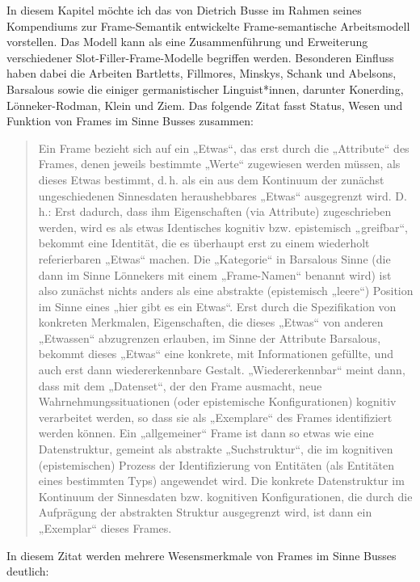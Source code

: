 In diesem Kapitel möchte ich das von Dietrich Busse im Rahmen seines Kompendiums zur Frame-Semantik \autocite*{busseFrameSemantikKompendium2012} entwickelte Frame-semantische Arbeitsmodell vorstellen. Das Modell kann als eine Zusammenführung und Erweiterung verschiedener Slot-Filler-Frame-Modelle begriffen werden. Besonderen Einfluss haben dabei die Arbeiten Bartletts, Fillmores, Minskys, Schank und Abelsons, Barsalous sowie die einiger germanistischer Linguist*innen, darunter Konerding, Lönneker-Rodman, Klein und Ziem. Das folgende Zitat fasst Status, Wesen und Funktion von Frames im Sinne Busses zusammen:

\begin{quote}
Ein Frame bezieht sich auf ein „Etwas``, das erst durch die „Attribute`` des Frames, denen jeweils bestimmte „Werte`` zugewiesen werden müssen, als dieses Etwas bestimmt, d.\,h. als ein aus dem Kontinuum der zunächst ungeschiedenen Sinnesdaten heraushebbares „Etwas`` ausgegrenzt wird. D.\,h.: Erst dadurch, dass ihm Eigenschaften (via Attribute) zugeschrieben werden, wird es als etwas Identisches kognitiv bzw. epistemisch „greifbar``, bekommt eine Identität, die es überhaupt erst zu einem wiederholt referierbaren „Etwas`` machen. Die „Kategorie`` in Barsalous Sinne (die dann im Sinne Lönnekers mit einem „Frame-Namen`` benannt wird) ist also zunächst nichts anders als eine abstrakte (epistemisch „leere``) Position im Sinne eines „hier gibt es ein Etwas``. Erst durch die Spezifikation von konkreten Merkmalen, Eigenschaften, die dieses „Etwas`` von anderen „Etwassen`` abzugrenzen erlauben, im Sinne der Attribute Barsalous, bekommt dieses „Etwas`` eine konkrete, mit Informationen gefüllte, und auch erst dann wiedererkennbare Gestalt. „Wiedererkennbar`` meint dann, dass mit dem „Datenset``, der den Frame ausmacht, neue Wahrnehmungssituationen (oder epistemische Konfigurationen) kognitiv verarbeitet werden, so dass sie als „Exemplare`` des Frames identifiziert werden können. Ein „allgemeiner`` Frame ist dann so etwas wie eine Datenstruktur, gemeint als abstrakte „Suchstruktur``, die im kognitiven (epistemischen) Prozess der Identifizierung von Entitäten (als Entitäten eines bestimmten Typs) angewendet wird. Die konkrete Datenstruktur im Kontinuum der Sinnesdaten bzw. kognitiven Konfigurationen, die durch die Aufprägung der abstrakten Struktur ausgegrenzt wird, ist dann ein „Exemplar`` dieses Frames. \autocite[589]{busseFrameSemantikKompendium2012}
\end{quote}

In diesem Zitat werden mehrere Wesensmerkmale von Frames im Sinne Busses deutlich:

